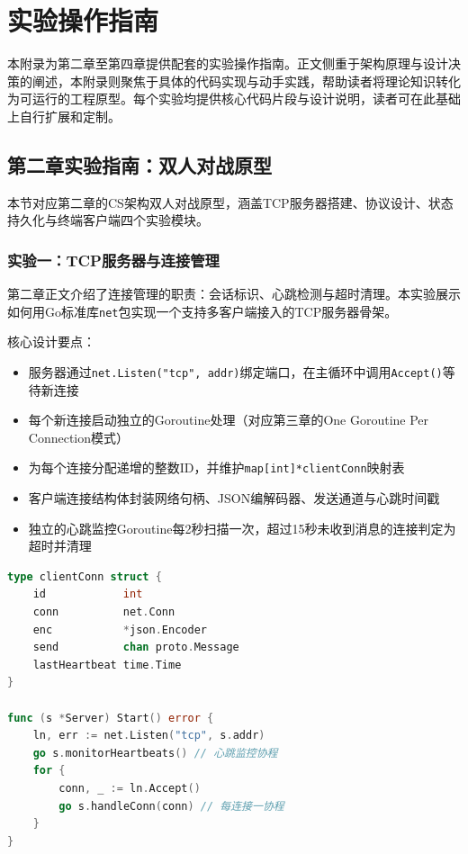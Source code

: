 \section{实验操作指南}
\label{sec:appendix-lab-guide}

本附录为第二章至第四章提供配套的实验操作指南。正文侧重于架构原理与设计决策的阐述，本附录则聚焦于具体的代码实现与动手实践，帮助读者将理论知识转化为可运行的工程原型。每个实验均提供核心代码片段与设计说明，读者可在此基础上自行扩展和定制。

\subsection{第二章实验指南：双人对战原型}

本节对应第二章的CS架构双人对战原型，涵盖TCP服务器搭建、协议设计、状态持久化与终端客户端四个实验模块。

\subsubsection{实验一：TCP服务器与连接管理}

第二章正文介绍了连接管理的职责：会话标识、心跳检测与超时清理。本实验展示如何用Go标准库\texttt{net}包实现一个支持多客户端接入的TCP服务器骨架。

核心设计要点：
\begin{itemize}
\item 服务器通过\texttt{net.Listen("tcp", addr)}绑定端口，在主循环中调用\texttt{Accept()}等待新连接
\item 每个新连接启动独立的Goroutine处理（对应第三章的One Goroutine Per Connection模式）
\item 为每个连接分配递增的整数ID，并维护\texttt{map[int]*clientConn}映射表
\item 客户端连接结构体封装网络句柄、JSON编解码器、发送通道与心跳时间戳
\item 独立的心跳监控Goroutine每2秒扫描一次，超过15秒未收到消息的连接判定为超时并清理
\end{itemize}

\begin{tcolorbox}[title=服务器连接管理核心结构]
\begin{lstlisting}[style=codeblock, language=go]
type clientConn struct {
    id            int
    conn          net.Conn
    enc           *json.Encoder
    send          chan proto.Message
    lastHeartbeat time.Time
}

func (s *Server) Start() error {
    ln, err := net.Listen("tcp", s.addr)
    go s.monitorHeartbeats() // 心跳监控协程
    for {
        conn, _ := ln.Accept()
        go s.handleConn(conn) // 每连接一协程
    }
}
\end{lstlisting}
\end{tcolorbox}

